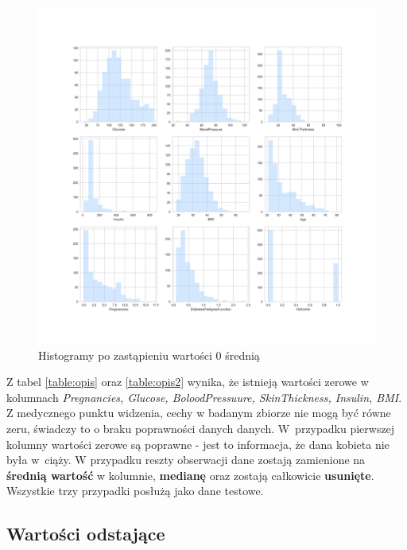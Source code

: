 \documentclass[12pt]{article}
\begin{document}
\begin{figure}
	\begin{adjustwidth}{-3.3cm}{}
		\centering
		\includegraphics[width=1.5\textwidth]{images/histograms_average.jpg}
		\caption{Histogramy po zastąpieniu wartości 0 średnią}
		\label{fig:outliers}
	\end{adjustwidth}
\end{figure}

Z tabel \ref{table:opis} oraz \ref{table:opis2} wynika, że istnieją wartości zerowe w kolumnach \textit{Pregnancies, Glucose, BoloodPressuure, SkinThickness, Insulin, BMI}. Z medycznego punktu widzenia, cechy w badanym zbiorze nie mogą być równe zeru, świadczy to o braku poprawności danych danych. W~przypadku pierwszej kolumny wartości zerowe są poprawne - jest to informacja, że dana kobieta nie była w~ciąży. W przypadku reszty obserwacji dane zostają zamienione na \textbf{średnią wartość} w kolumnie, \textbf{medianę} oraz zostają całkowicie \textbf{usunięte}. Wszystkie trzy przypadki posłużą jako dane testowe.

\subsection{Wartości odstające}
\end{document}
